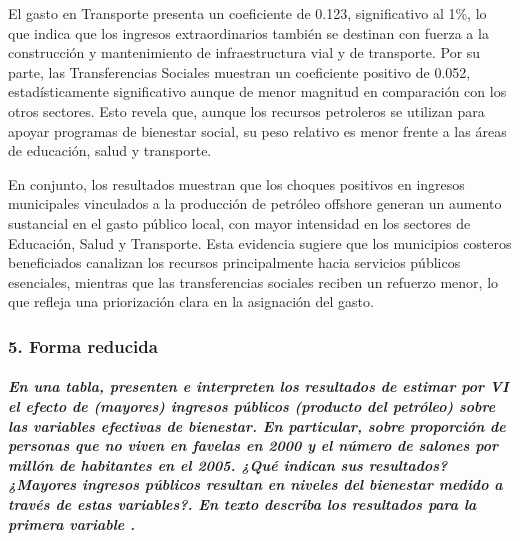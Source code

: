 \documentclass[
]{article}
\begin{document}
El gasto en Transporte presenta un coeficiente de 0.123, significativo
al 1\%, lo que indica que los ingresos extraordinarios también se
destinan con fuerza a la construcción y mantenimiento de infraestructura
vial y de transporte. Por su parte, las Transferencias Sociales muestran
un coeficiente positivo de 0.052, estadísticamente significativo aunque
de menor magnitud en comparación con los otros sectores. Esto revela
que, aunque los recursos petroleros se utilizan para apoyar programas de
bienestar social, su peso relativo es menor frente a las áreas de
educación, salud y transporte.

En conjunto, los resultados muestran que los choques positivos en
ingresos municipales vinculados a la producción de petróleo offshore
generan un aumento sustancial en el gasto público local, con mayor
intensidad en los sectores de Educación, Salud y Transporte. Esta
evidencia sugiere que los municipios costeros beneficiados canalizan los
recursos principalmente hacia servicios públicos esenciales, mientras
que las transferencias sociales reciben un refuerzo menor, lo que
refleja una priorización clara en la asignación del gasto.

\subsubsection{5. Forma reducida}\label{forma-reducida}

\subparagraph{En una tabla, presenten e interpreten los resultados de
estimar por VI el efecto de (mayores) ingresos públicos (producto del
petróleo) sobre las variables efectivas de bienestar. En particular,
sobre proporción de personas que no viven en favelas en 2000 y el número
de salones por millón de habitantes en el 2005. ¿Qué indican sus
resultados? ¿Mayores ingresos públicos resultan en niveles del bienestar
medido a través de estas variables?. En texto describa los resultados
para la primera variable
.}\label{en-una-tabla-presenten-e-interpreten-los-resultados-de-estimar-por-vi-el-efecto-de-mayores-ingresos-puxfablicos-producto-del-petruxf3leo-sobre-las-variables-efectivas-de-bienestar.-en-particular-sobre-proporciuxf3n-de-personas-que-no-viven-en-favelas-en-2000-y-el-nuxfamero-de-salones-por-milluxf3n-de-habitantes-en-el-2005.-quuxe9-indican-sus-resultados-mayores-ingresos-puxfablicos-resultan-en-niveles-del-bienestar-medido-a-travuxe9s-de-estas-variables.-en-texto-describa-los-resultados-para-la-primera-variable-.}
\end{document}
